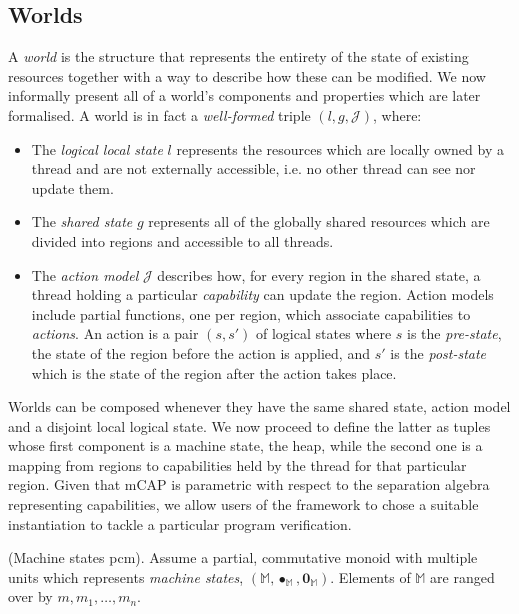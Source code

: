 \subsection{Worlds} \label{worlds}

A \textit{world} is the structure that represents the entirety of the state of existing resources together with a way to describe how these can be modified. We now informally present all of a world's components and properties which are later formalised. A world is in fact a \textit{well-formed} triple $(l, g, \mathcal{J})$, where:
\begin{itemize}
	\item The \textit{logical local state} $l$ represents the resources which are locally owned by a thread and are not externally accessible, i.e. no other thread can see nor update them.
	\item The \textit{shared state} $g$ represents all of the globally shared resources which are divided into regions and accessible to all threads.
	\item The \textit{action model} $\mathcal{J}$ describes how, for every region in the shared state, a thread holding a particular \textit{capability} can update the region. Action models include partial functions, one per region, which associate capabilities to \textit{actions}. An action is a pair $(s, s')$ of logical states where $s$ is the \textit{pre-state}, the state of the region before the action is applied, and $s'$ is the \textit{post-state} which is the state of the region after the action takes place.
\end{itemize}

Worlds can be composed whenever they have the same shared state, action model and a disjoint local logical state. We now proceed to define the latter as tuples whose first component is a machine state, the heap, while the second one is a mapping from regions to capabilities held by the thread for that particular region. Given that mCAP is parametric with respect to the separation algebra representing capabilities, we allow users of the framework to chose a suitable instantiation to tackle a particular program verification.

\begin{param}
	(Machine states pcm).
	Assume a partial, commutative monoid with multiple units which represents \emph{machine states}, $(\mathbb{M}, \bullet_\mathbb{M}, \mathbf{0}_\mathbb{M})$. Elements of $\mathbb{M}$ are ranged over by $m, m_1, \ldots, m_n$.
\end{param}

